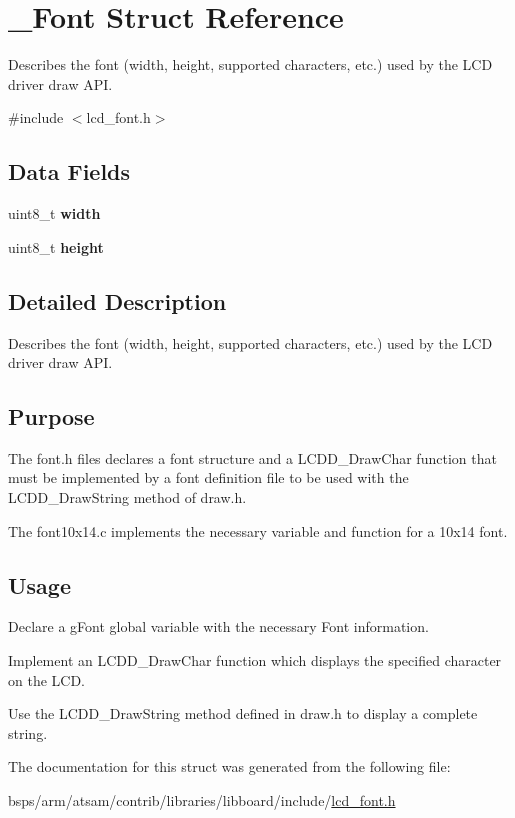 \hypertarget{struct__Font}{}\section{\+\_\+\+Font Struct Reference}
\label{struct__Font}


Describes the font (width, height, supported characters, etc.) used by the L\+CD driver draw A\+PI.  




{\ttfamily \#include $<$lcd\+\_\+font.\+h$>$}

\subsection*{Data Fields}
\begin{DoxyCompactItemize}
\item 
\mbox{\label{struct__Font_a353af84ea3920d5ee329ea8054b1757d}} 
uint8\+\_\+t {\bfseries width}
\item 
\mbox{\label{struct__Font_a10b0ea220c6a0d95d813c4d971cf5834}} 
uint8\+\_\+t {\bfseries height}
\end{DoxyCompactItemize}


\subsection{Detailed Description}
Describes the font (width, height, supported characters, etc.) used by the L\+CD driver draw A\+PI. 

\hypertarget{group__RTEMSBSPsARM_Purpose}{}\subsection{Purpose}\label{group__RTEMSBSPsARM_Purpose}
The font.\+h files declares a font structure and a L\+C\+D\+D\+\_\+\+Draw\+Char function that must be implemented by a font definition file to be used with the L\+C\+D\+D\+\_\+\+Draw\+String method of draw.\+h.

The font10x14.\+c implements the necessary variable and function for a 10x14 font.\hypertarget{group__RTEMSBSPsARM_Usage}{}\subsection{Usage}\label{group__RTEMSBSPsARM_Usage}

\begin{DoxyEnumerate}
\item Declare a g\+Font global variable with the necessary Font information.
\item Implement an L\+C\+D\+D\+\_\+\+Draw\+Char function which displays the specified character on the L\+CD.
\item Use the L\+C\+D\+D\+\_\+\+Draw\+String method defined in draw.\+h to display a complete string. 
\end{DoxyEnumerate}

The documentation for this struct was generated from the following file\+:\begin{DoxyCompactItemize}
\item 
bsps/arm/atsam/contrib/libraries/libboard/include/\mbox{\hyperlink{lcd__font_8h}{lcd\+\_\+font.\+h}}\end{DoxyCompactItemize}
